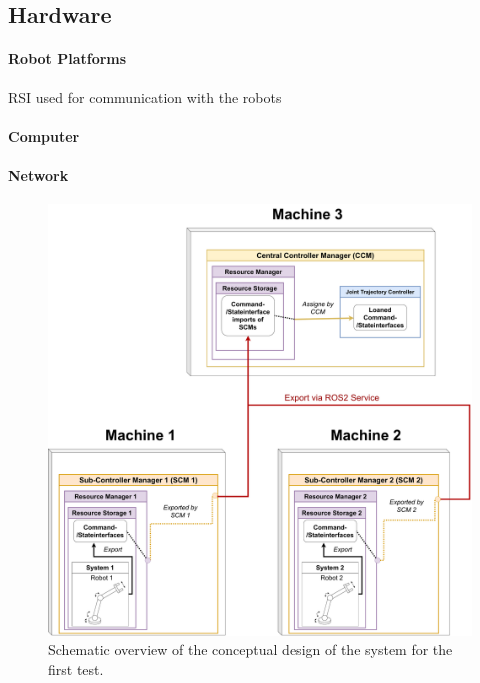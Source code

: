 \subsection{Hardware}
\paragraph{Robot Platforms}
RSI used for communication with the robots
\paragraph{Computer}
\paragraph{Network}
\begin{figure}[htbp]
	\centering
	\includegraphics[width=1\textwidth]{Figures/c6/test_scenario_1.drawio.pdf}
	\caption{Schematic overview of the conceptual design of the system for the first test.}
	\label{c6_fig_test_scenario_1}
\end{figure}
